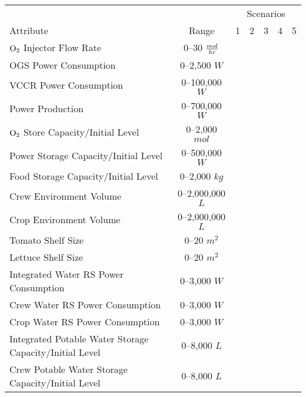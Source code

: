 \documentclass[submit]{aiaa}
\begin{document}
\begin{table}[htb]
	\centering
	\begin{tabular}{l c c c c c c}
	\hline
	& & \multicolumn{5}{c}{Scenarios} \\
	Attribute & Range & 1 & 2 & 3 & 4 & 5 \\
	\hline \hline 
	${\rm O}_2$ Injector Flow Rate & 0--30 ${mol \over hr}$ & \checkmark & \checkmark & \checkmark & \checkmark & \checkmark \\
	\hline
	OGS Power Consumption & 0--2,500 $W$ & \checkmark & \checkmark & \checkmark & \checkmark & \checkmark \\
	\hline
	VCCR Power Consumption & 0--100,000 $W$ & \checkmark & \checkmark & \checkmark & \checkmark & \checkmark \\
	\hline
	Power Production & 0--700,000 $W$ & \checkmark & \checkmark & \checkmark & \checkmark & \checkmark \\
	\hline
	${\rm O}_2$ Store Capacity/Initial Level & 0--2,000 $mol$ & \checkmark & \checkmark & \checkmark & \checkmark & \checkmark \\
	\hline
	Power Storage Capacity/Initial Level & 0--500,000 $W$ & \checkmark & \checkmark & \checkmark & \checkmark & \checkmark \\
	\hline
	Food Storage Capacity/Initial Level & 0--2,000 $kg$ & \checkmark & \checkmark & \checkmark & \checkmark & \checkmark \\
	\hline
	Crew Environment Volume & 0--2,000,000 $L$ & \checkmark & \checkmark & \checkmark & \checkmark & \checkmark \\
	\hline
	Crop Environment Volume & 0--2,000,000 $L$ & & & & \checkmark & \checkmark \\
	\hline
	Tomato Shelf Size & 0--20 $m^2$ & & \checkmark & \checkmark & \checkmark & \checkmark \\ \hline
	Lettuce Shelf Size & 0--20 $m^2$ & & \checkmark & \checkmark & \checkmark & \checkmark \\ \hline
	Integrated Water RS Power Consumption & 0--3,000 $W$ & \checkmark & \checkmark & & \checkmark \\
	Crew Water RS Power Consumption & 0--3,000 $W$ & & & \checkmark & & \checkmark \\
	Crop Water RS Power Consumption & 0--3,000 $W$ & & & \checkmark & & \checkmark \\ \hline
	Integrated Potable Water Storage Capacity/Initial Level & 0--8,000 $L$ & \checkmark & \checkmark & & \checkmark \\
	Crew Potable Water Storage Capacity/Initial Level & 0--8,000 $L$ & & & \checkmark & & \checkmark \\

\end{tabular}
\end{table}
\end{document}
